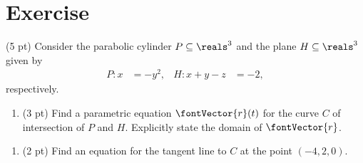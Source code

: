 \section{Exercise}

(5 pt) Consider the parabolic cylinder $P \subseteq \reals^{3}$ and the plane $H \subseteq \reals^{3}$ given by
\begin{align*}
P:
x
&=
-y^{2},
&
H:
x + y - z
&=
-2,
\end{align*}
respectively.
\begin{enumerate}[label=(\alph*)]
\item (3 pt) Find a parametric equation $\fontVector{r}(t)$ for the curve $C$ of intersection of $P$ and $H$. Explicitly state the domain of $\fontVector{r}$.
\end{enumerate}

\spaceSolution{2.5in}{}

\begin{enumerate}[resume,label=(\alph*)]
\item (2 pt) Find an equation for the tangent line to $C$ at the point $(-4,2,0)$.
\end{enumerate}

\spaceSolution{3in}{}